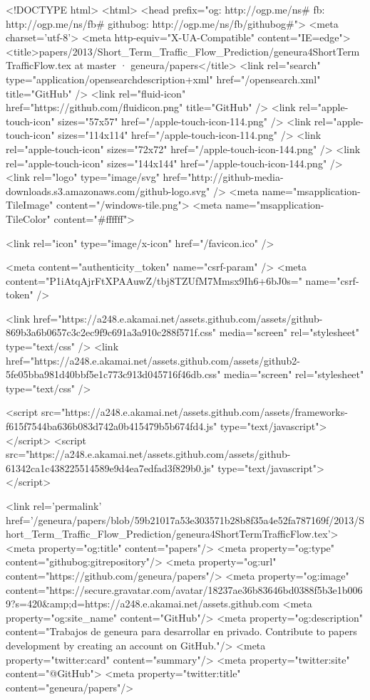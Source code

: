   


<!DOCTYPE html>
<html>
  <head prefix="og: http://ogp.me/ns# fb: http://ogp.me/ns/fb# githubog: http://ogp.me/ns/fb/githubog#">
    <meta charset='utf-8'>
    <meta http-equiv="X-UA-Compatible" content="IE=edge">
        <title>papers/2013/Short_Term_Traffic_Flow_Prediction/geneura4ShortTermTrafficFlow.tex at master · geneura/papers</title>
    <link rel="search" type="application/opensearchdescription+xml" href="/opensearch.xml" title="GitHub" />
    <link rel="fluid-icon" href="https://github.com/fluidicon.png" title="GitHub" />
    <link rel="apple-touch-icon" sizes="57x57" href="/apple-touch-icon-114.png" />
    <link rel="apple-touch-icon" sizes="114x114" href="/apple-touch-icon-114.png" />
    <link rel="apple-touch-icon" sizes="72x72" href="/apple-touch-icon-144.png" />
    <link rel="apple-touch-icon" sizes="144x144" href="/apple-touch-icon-144.png" />
    <link rel="logo" type="image/svg" href="http://github-media-downloads.s3.amazonaws.com/github-logo.svg" />
    <meta name="msapplication-TileImage" content="/windows-tile.png">
    <meta name="msapplication-TileColor" content="#ffffff">

    
    
    <link rel="icon" type="image/x-icon" href="/favicon.ico" />

    <meta content="authenticity_token" name="csrf-param" />
<meta content="P1iAtqAjrFtXPAAuwZ/tbj8TZUfM7Mmsx9Ih6+6bJ0s=" name="csrf-token" />

    <link href="https://a248.e.akamai.net/assets.github.com/assets/github-869b3a6b0657c3c2ec9f9c691a3a910c288f571f.css" media="screen" rel="stylesheet" type="text/css" />
    <link href="https://a248.e.akamai.net/assets.github.com/assets/github2-5fe05bba981d40bbf5e1c773c913d045716f46db.css" media="screen" rel="stylesheet" type="text/css" />
    


      <script src="https://a248.e.akamai.net/assets.github.com/assets/frameworks-f615f7544ba636b083d742a0b415479b5b674fd4.js" type="text/javascript"></script>
      <script src="https://a248.e.akamai.net/assets.github.com/assets/github-61342ca1c438225514589e9d4ea7edfad3f829b0.js" type="text/javascript"></script>
      

        <link rel='permalink' href='/geneura/papers/blob/59b21017a53e303571b28b8f35a4e52fa787169f/2013/Short_Term_Traffic_Flow_Prediction/geneura4ShortTermTrafficFlow.tex'>
    <meta property="og:title" content="papers"/>
    <meta property="og:type" content="githubog:gitrepository"/>
    <meta property="og:url" content="https://github.com/geneura/papers"/>
    <meta property="og:image" content="https://secure.gravatar.com/avatar/18237ae36b83646bd0388f5b3e1b0069?s=420&amp;d=https://a248.e.akamai.net/assets.github.com%
    <meta property="og:site_name" content="GitHub"/>
    <meta property="og:description" content="Trabajos de geneura para desarrollar en privado. Contribute to papers development by creating an account on GitHub."/>
    <meta property="twitter:card" content="summary"/>
    <meta property="twitter:site" content="@GitHub">
    <meta property="twitter:title" content="geneura/papers"/>

